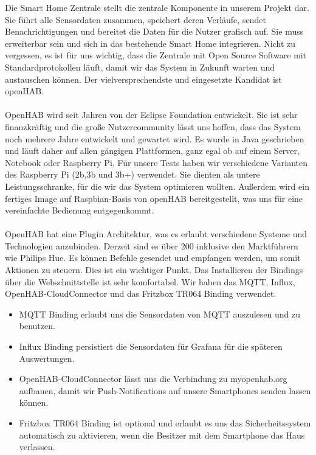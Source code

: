 \documentclass[a4paper,10pt,twocolumn]{article}
\begin{document}
Die Smart Home Zentrale stellt die zentrale Komponente in unserem Projekt dar. Sie führt alle Sensordaten zusammen, speichert deren Verläufe, sendet Benachrichtigungen und bereitet die Daten für die Nutzer grafisch auf. Sie muss erweiterbar sein und sich in das bestehende Smart Home integrieren. Nicht zu vergessen, es ist für uns wichtig, dass die Zentrale mit Open Source Software mit Standardprotokollen läuft, damit wir das System in Zukunft warten und austauschen können. Der vielversprechendste und eingesetzte Kandidat ist \acf{openHAB}.\\\\
OpenHAB wird seit Jahren von der Eclipse Foundation entwickelt. Sie ist sehr finanzkräftig und die große Nutzercommunity lässt uns hoffen, dass das System noch mehrere Jahre entwickelt und gewartet wird. Es wurde in Java geschrieben und läuft daher auf allen gängigen Plattformen, ganz egal ob auf einem Server, Notebook oder Raspberry Pi. Für unsere Tests haben wir verschiedene Varianten des Raspberry Pi (2b,3b und 3b+) verwendet. Sie dienten als untere Leistungsschranke, für die wir das System optimieren wollten. Außerdem wird ein fertiges Image auf Raspbian-Basis von openHAB bereitgestellt, was uns für eine vereinfachte Bedienung entgegenkommt.\\\\
OpenHAB hat eine Plugin Architektur, was es erlaubt verschiedene Systeme und Technologien anzubinden. Derzeit sind es über 200 inklusive den Marktführern wie Philips Hue. Es können Befehle gesendet und empfangen werden, um somit Aktionen zu steuern. Dies ist ein wichtiger Punkt. Das Installieren der Bindings über die Webschnittstelle ist sehr komfortabel. Wir haben das MQTT, Influx, OpenHAB-CloudConnector und das Fritzbox TR064 Binding verwendet.

\begin{itemize}
    \item MQTT Binding erlaubt uns die Sensordaten von MQTT auszulesen und zu benutzen.
    \item Influx Binding persistiert die Sensordaten für Grafana für die späteren Auswertungen.
    \item OpenHAB-CloudConnector lässt uns die Verbindung zu myopenhab.org aufbauen, damit wir Push-Notifications auf unsere Smartphones senden lassen können.
    \item Fritzbox TR064 Binding ist optional und erlaubt es uns das Sicherheitssystem automatisch zu aktivieren, wenn die Besitzer mit dem Smartphone das Haus verlassen.
\end{itemize}
\end{document}

